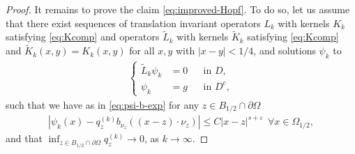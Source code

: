 \documentclass[11pt,reqno]{amsart}
\theoremstyle{plain}
\theoremstyle{definition}
\numberwithin{equation}{section}
\newcommand{\eps}{\varepsilon}
\newcommand{\1}{\mathbbm{1}}
\begin{document}
\begin{proof}
It remains to prove the claim \eqref{eq:improved-Hopf}. To do so, let us assume that there exist sequences of translation invariant operators $L_k$ with kernels $K_k$ satisfying \eqref{eq:Kcomp} and operators $\widetilde{L}_k$ with kernels $\widetilde{K}_k$ satisfying \eqref{eq:Kcomp} and $\widetilde{K}_k(x, y)=K_k(x, y)$ for all $x, y$ with $|x-y|<1/4$, and solutions $\psi_k$ to
\begin{align*}
\left\{
\begin{aligned}
\widetilde{L}_k \psi_k &= 0 &&\text{in } D,\\
\psi_k &= g &&\text{in } D^c,
\end{aligned}
\right.
\end{align*}
such that we have as in \eqref{eq:psi-b-exp} for any $z \in B_{1/2} \cap \partial \Omega$
\begin{align}
\label{eq:psi-k-exp}
|\psi_k(x) - q^{(k)}_z b_{\nu_z}((x-z) \cdot \nu_z)| \le C |x-z|^{s+\eps} ~~ \forall x \in \Omega_{1/2},
\end{align}
and that $\inf_{z \in B_{1/2} \cap \partial \Omega} q^{(k)}_z \to 0$, as $k \to \infty$. 


\end{proof}
\end{document}
